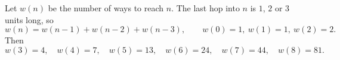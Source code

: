 Let $w(n)$ be the number of ways to reach $n$. The last hop into $n$ is $1$, $2$ or $3$ units long, so
\[
w(n)=w(n-1)+w(n-2)+w(n-3),\qquad w(0)=1,\ w(1)=1,\ w(2)=2 .
\]
Then
\[
w(3)=4,\quad w(4)=7,\quad w(5)=13,\quad w(6)=24,\quad w(7)=44,\quad w(8)=\boxed{81}.
\]
